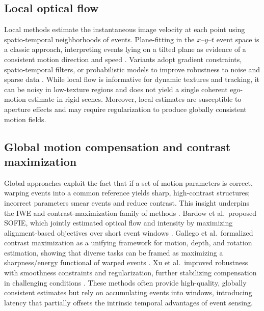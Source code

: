 \subsection{Local optical flow}
Local methods estimate the instantaneous image velocity at each point using spatio-temporal neighborhoods of events. Plane-fitting in the $x$–$y$–$t$ event space is a classic approach, interpreting events lying on a tilted plane as evidence of a consistent motion direction and speed \cite{Benosman2014}. Variants adopt gradient constraints, spatio-temporal filters, or probabilistic models to improve robustness to noise and sparse data \cite{Gallego2020Survey}. While local flow is informative for dynamic textures and tracking, it can be noisy in low-texture regions and does not yield a single coherent ego-motion estimate in rigid scenes. Moreover, local estimates are susceptible to aperture effects and may require regularization to produce globally consistent motion fields.

\subsection{Global motion compensation and contrast maximization}
Global approaches exploit the fact that if a set of motion parameters is correct, warping events into a common reference yields sharp, high-contrast structures; incorrect parameters smear events and reduce contrast. This insight underpins the IWE and contrast-maximization family of methods \cite{Gallego2018CMax}. Bardow et al.\ proposed SOFIE, which jointly estimated optical flow and intensity by maximizing alignment-based objectives over short event windows \cite{Bardow2016SOFIE}. Gallego et al.\ formalized contrast maximization as a unifying framework for motion, depth, and rotation estimation, showing that diverse tasks can be framed as maximizing a sharpness/energy functional of warped events \cite{Gallego2018CMax}. Xu et al.\ improved robustness with smoothness constraints and regularization, further stabilizing compensation in challenging conditions \cite{Xu2020}. These methods often provide high-quality, globally consistent estimates but rely on accumulating events into windows, introducing latency that partially offsets the intrinsic temporal advantages of event sensing.


